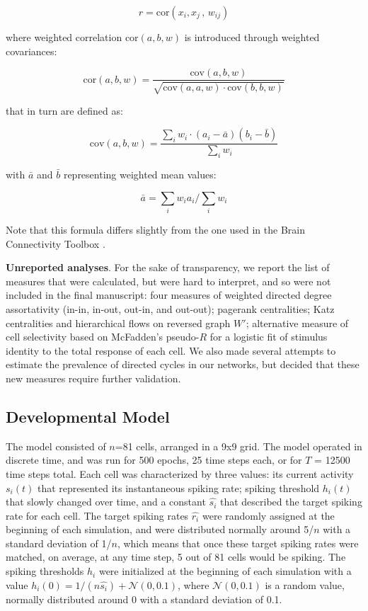 \documentclass{article}
\begin{document}
$$r=\text{cor}(x_i,x_j \, , \, w_{ij})$$

where weighted correlation $\text{cor}(a,b,w)$ is introduced through weighted covariances: 

$$\text{cor}(a,b,w) = \frac{\text{cov}(a,b,w)}{\sqrt{\text{cov}(a,a,w) \cdot \text{cov}(b,b,w)}}$$

that in turn are defined as: 

$$\text{cov}(a,b,w) = \frac{\sum_i{w_i \cdot (a_i-\bar{a})(b_i-\bar{b})}}{\sum_i{w_i}}$$

with $\bar{a}$ and $\bar{b}$ representing weighted mean values: 

$$\bar{a}=\sum_i{w_i a_i}/\sum_i{w_i}$$

Note that this formula differs slightly from the one used in the Brain Connectivity Toolbox \citep{rubinov2010toolbox}.

\textbf{Unreported analyses}. For the sake of transparency, we report the list of measures that were calculated, but were hard to interpret, and so were not included in the final manuscript: four measures of weighted directed degree assortativity (in-in, in-out, out-in, and out-out); pagerank centralities; Katz centralities and hierarchical flows on reversed graph $W'$; alternative measure of cell selectivity based on McFadden’s pseudo-$R$ for a logistic fit of stimulus identity to the total response of each cell. We also made several attempts to estimate the prevalence of directed cycles in our networks, but decided that these new measures require further validation.

\subsection*{Developmental Model}

The model consisted of $n$=81 cells, arranged in a 9x9 grid. The model operated in discrete time, and was run for 500 epochs, 25 time steps each, or for $T$ = 12500 time steps total. Each cell was characterized by three values: its current activity $s_i(t)$ that represented its instantaneous spiking rate; spiking threshold $h_i(t)$ that slowly changed over time, and a constant $\hat{s_i}$ that described the target spiking rate for each cell. The target spiking rates $\hat{r_i}$ were randomly assigned at the beginning of each simulation, and were distributed normally around 5/$n$ with a standard deviation of 1/$n$, which means that once these target spiking rates were matched, on average, at any time step, 5 out of 81 cells would be spiking. The spiking thresholds $h_i$ were initialized at the beginning of each simulation with a value $h_i(0) = 1/(n \hat{s_i}) + \mathcal{N}(0,0.1)$, where $\mathcal{N}(0,0.1)$ is a random value, normally distributed around 0 with a standard deviation of 0.1.
\end{document}
